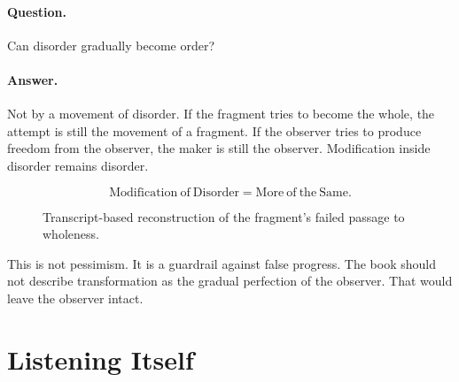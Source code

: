 \documentclass[11pt,oneside]{book}
\begin{document}
\paragraph{Question.}
Can disorder gradually become order?

\paragraph{Answer.}
Not by a movement of disorder. If the fragment tries to become the whole, the attempt is still the movement of a fragment. If the observer tries to produce freedom from the observer, the maker is still the observer. Modification inside disorder remains disorder.

\begin{equation}
\mathrm{Modification\ of\ Disorder}
=
\mathrm{More\ of\ the\ Same}.
\end{equation}

\begin{figure}
\centering
{}

Transcript-based reconstruction of the fragment's failed passage to wholeness.
\end{figure}

This is not pessimism. It is a guardrail against false progress. The book should not describe transformation as the gradual perfection of the observer. That would leave the observer intact.

\section{Listening Itself}
\end{document}
